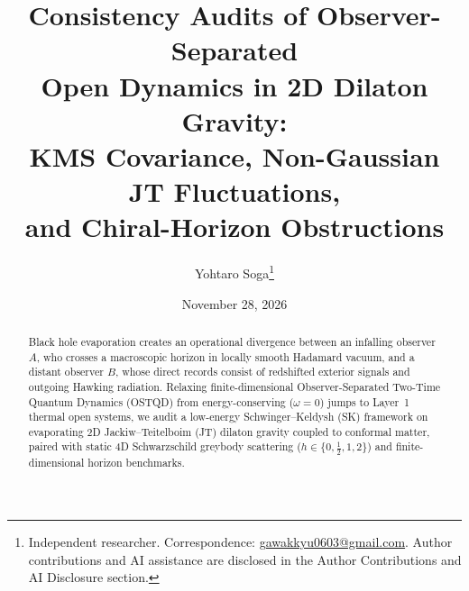 \documentclass[11pt,a4paper]{article}
\title{\textbf{Consistency Audits of Observer-Separated\\
Open Dynamics in 2D Dilaton Gravity:\\
KMS Covariance, Non-Gaussian JT Fluctuations,\\
and Chiral-Horizon Obstructions}}
\author{Yohtaro Soga\thanks{Independent researcher. Correspondence: \href{mailto:gawakkyu0603@gmail.com}{gawakkyu0603@gmail.com}. Author contributions and AI assistance are disclosed in the Author Contributions and AI Disclosure section.}}
\date{November 28, 2026}
\theoremstyle{definition}
\theoremstyle{remark}
\newcommand{\1}{\mathbf{1}}
\begin{document}
\maketitle
\vspace{-1.2em}
\begin{abstract}\small
Black hole evaporation creates an operational divergence between an infalling observer $A$, who crosses a macroscopic horizon in locally smooth Hadamard vacuum, and a distant observer $B$, whose direct records consist of redshifted exterior signals and outgoing Hawking radiation. Relaxing finite-dimensional Observer-Separated Two-Time Quantum Dynamics (OSTQD) from energy-conserving ($\omega=0$) jumps to Layer~1 thermal open systems, we audit a low-energy Schwinger--Keldysh (SK) framework on evaporating 2D Jackiw--Teitelboim (JT) dilaton gravity coupled to conformal matter, paired with static 4D Schwarzschild greybody scattering ($h\in\{0,\frac{1}{2},1,2\}$) and finite-dimensional horizon benchmarks.


\end{abstract}
\end{document}
